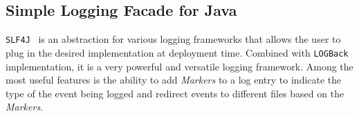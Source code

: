 \subsection{Simple Logging Facade for Java}
\texttt{SLF4J}~\cite{SLF4J} is an abstraction for various logging frameworks that allows the user to plug in the desired implementation at deployment time. Combined with \texttt{LOGBack}~\cite{logback} implementation, it is a very powerful and versatile logging framework. Among the most useful features is the ability to add \textit{Markers} to a log entry to indicate the type of the event being logged and redirect events to different files based on the \textit{Markers}.
